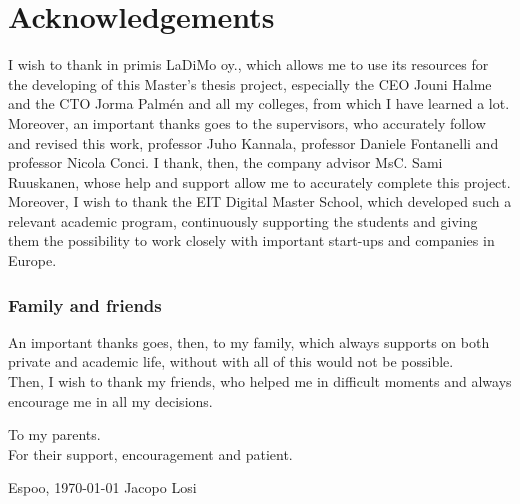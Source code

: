 \documentclass[12pt,a4paper,oneside,pdftex]{report}
\newcommand{\DATE}{\today}
\newcommand{\AUTHOR}{Jacopo Losi}
\begin{document}


\chapter*{Acknowledgements}

I wish to thank in primis LaDiMo oy., which allows me to use its resources for the developing of this Master's thesis project, especially the CEO Jouni Halme and the CTO Jorma Palmén and all my colleges, from which I have learned a lot.
Moreover, an important thanks goes to the supervisors, who accurately follow and revised this work, professor Juho Kannala, professor Daniele Fontanelli and professor Nicola Conci.
I thank, then, the company advisor MsC. Sami Ruuskanen, whose help and support allow me to accurately complete this project.\\
Moreover, I wish to thank the EIT Digital Master School, which developed such a relevant academic program, continuously supporting the students and giving them the possibility to work closely with important start-ups and companies in Europe.

\subsection*{Family and friends}
An important thanks goes, then, to my family, which always supports on both private and academic life, without with all of this would not be possible.\\
Then, I wish to thank my friends, who helped me in difficult moments and always encourage me in all my decisions.\\

\begin{flushright}
To my parents.\\
For their support, encouragement and patient. 
\end{flushright} 

\vfill

\noindent Espoo, \DATE
\vskip 5mm
\noindent\AUTHOR

\cleardoublepage

\end{document}
